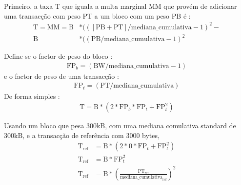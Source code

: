 Primeiro, a taxa T que iguala a multa marginal MM que provém de adicionar uma transacção com peso PT a um bloco com um peso PB é :
\begin{align*}
    \textrm{T} = \textrm{MM} = \textrm{B}&*(([\textrm{PB} + \textrm{PT}]/\textrm{mediana\_cumulativa} - 1)^2 -\\ \textrm{B}&*((\textrm{PB}/\textrm{mediana\_cumulativa} - 1)^2
\end{align*}

Define-se o factor de peso do bloco :
\begin{align*}
\textrm{FP}_b = (\textrm{BW}/\textrm{mediana\_cumulativa} - 1)
\end{align*}
e o factor de peso de uma transacção :
\begin{align*}
\textrm{FP}_t = (\textrm{PT}/\textrm{mediana\_cumulativa})
\end{align*}
De forma simples :
\begin{align*}
\textrm{T} = \textrm{B}*(2*\textrm{FP}_b*\textrm{FP}_t + \textrm{FP}_t^2)
\end{align*}



Usando um bloco que pesa 300kB, com uma mediana comulativa standard de 300kB, e a transacção de referência com 3000 bytes,
\begin{align*}
    \textrm{T}_{\textrm{ref}} &= \textrm{B}*(2*0*\textrm{FP}_t + \textrm{FP}_t^2)\\
    \textrm{T}_{\textrm{ref}} &= \textrm{B}*\textrm{FP}_t^2\\
    \textrm{T}_{\textrm{ref}} &= \textrm{B}*(\frac{\textrm{PT}_{\textrm{ref}}}{\textrm{mediana\_cumulativa}_{\textrm{ref}}})^2
\end{align*}


